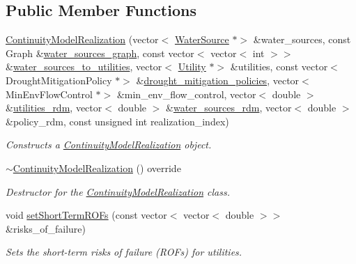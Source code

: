 \subsection*{Public Member Functions}
\begin{DoxyCompactItemize}
\item 
\mbox{\hyperlink{classContinuityModelRealization_a641c096ac73586597b3e21a5d516c923}{Continuity\+Model\+Realization}} (vector$<$ \mbox{\hyperlink{classWaterSource}{Water\+Source}} $\ast$$>$ \&water\+\_\+sources, const Graph \&\mbox{\hyperlink{classContinuityModel_a563401588c6fa622f03393909a3522db}{water\+\_\+sources\+\_\+graph}}, const vector$<$ vector$<$ int $>$$>$ \&\mbox{\hyperlink{classContinuityModel_ae8516bcbbf52650190277fc8b06c1843}{water\+\_\+sources\+\_\+to\+\_\+utilities}}, vector$<$ \mbox{\hyperlink{classUtility}{Utility}} $\ast$$>$ \&utilities, const vector$<$ Drought\+Mitigation\+Policy $\ast$$>$ \&\mbox{\hyperlink{classContinuityModelRealization_a757dcf1de115c674fd5adcb040c5f277}{drought\+\_\+mitigation\+\_\+policies}}, vector$<$ Min\+Env\+Flow\+Control $\ast$$>$ \&min\+\_\+env\+\_\+flow\+\_\+control, vector$<$ double $>$ \&\mbox{\hyperlink{classContinuityModel_aa4a00b76da6295d2faa11e3dcaea1896}{utilities\+\_\+rdm}}, vector$<$ double $>$ \&\mbox{\hyperlink{classContinuityModel_ab7b8fa93a6f56b328e425e1ead6cfefa}{water\+\_\+sources\+\_\+rdm}}, vector$<$ double $>$ \&policy\+\_\+rdm, const unsigned int realization\+\_\+index)
\begin{DoxyCompactList}\small\item\em Constructs a \mbox{\hyperlink{classContinuityModelRealization}{Continuity\+Model\+Realization}} object. \end{DoxyCompactList}\item 
\mbox{\hyperlink{classContinuityModelRealization_afd53069e2f9ab96210ff153d16f01269}{$\sim$\+Continuity\+Model\+Realization}} () override
\begin{DoxyCompactList}\small\item\em Destructor for the \mbox{\hyperlink{classContinuityModelRealization}{Continuity\+Model\+Realization}} class. \end{DoxyCompactList}\item 
void \mbox{\hyperlink{classContinuityModelRealization_ae2c40328beb671fa9b10ecc2921b8375}{set\+Short\+Term\+R\+O\+Fs}} (const vector$<$ vector$<$ double $>$$>$ \&risks\+\_\+of\+\_\+failure)
\begin{DoxyCompactList}\small\item\em Sets the short-\/term risks of failure (R\+O\+Fs) for utilities. \end{DoxyCompactList}\item 

\end{DoxyCompactItemize}
